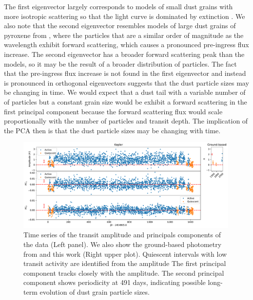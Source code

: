 \documentclass[preprint,trackchanges]{aastex61}
\begin{document}
The first eigenvector largely corresponds to models of small dust grains with more isotropic scattering so that the light curve is dominated by extinction \citep{budaj12,brogi2012}.
We also note that the second eigenvector resembles models of large dust grains of pyroxene from \citet{budaj12}, where the particles that are a similar order of magnitude as the wavelength exhibit forward scattering, which causes a pronounced pre-ingress flux increase.
The second eigenvector has a broader forward scattering peak than the \citet{budaj12} models, so it may be the result of a broader distribution of particles.
The fact that the pre-ingress flux increase is not found in the first eigenvector and instead is pronounced in orthogonal eigenvectors suggests that the dust particle sizes may be changing in time.
We would expect that a dust tail with a variable number of of particles but a constant grain size would be exhibit a forward scattering in the first principal component because the forward scattering flux would scale proportionally with the number of particles and transit depth.
The implication of the PCA then is that the dust particle sizes may be changing with time.

\begin{figure}[!hbtp]
\begin{centering}
\includegraphics[width=0.99\textwidth]{pc_tser_w_quiescent.pdf}
\caption{Time series of the transit amplitude and principals components of the  data (Left panel).
We also show the ground-based photometry from \citet{schlawin2016kic1255} and this work (Right upper plot).
Quiescent intervals with low transit activity are identified from the amplitude 
The first principal component tracks closely with the amplitude.
The second principal component shows periodicity at 491 days, indicating possible long-term evolution of dust grain particle sizes.
}\label{fig:tserPC}
\end{centering}
\end{figure}
\end{document}
